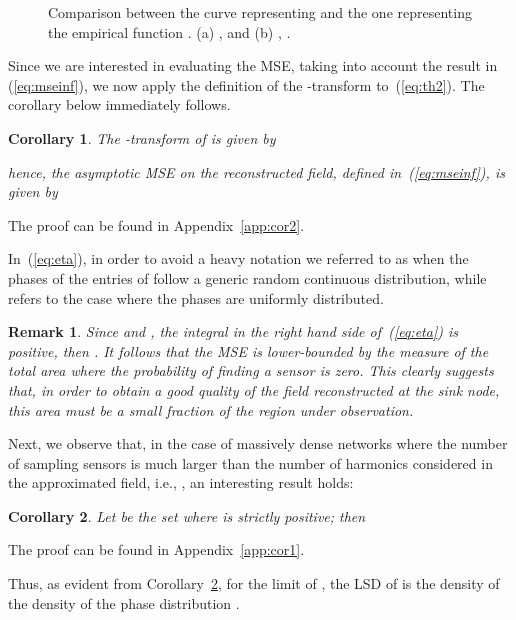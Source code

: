 \documentclass[11pt, draftcls, onecolumn, a4paper]{IEEEtran}
\newtheorem{corollary}{Corollary}[section]
\newtheorem{remark}{Remark}[section]
\begin{document}
\begin{figure}
\centering 
{}
\hspace{0.05\columnwidth}
\caption{Comparison between the curve representing 
 and the one representing
the empirical function .
(a) ,  and (b) , .}
\end{figure}


Since we are  interested in evaluating the MSE, taking into account 
the result in (\ref{eq:mseinf}), we now apply the definition of the 
-transform to~(\ref{eq:th2}).
The corollary below immediately follows.
\begin{corollary}
\label{cor2}
The -transform of  is given by
 
hence, the asymptotic MSE on the reconstructed field, 
defined in~(\ref{eq:mseinf}), is given by 
 
\end{corollary}
\begin{IEEEproof}
The proof can be found in Appendix~\ref{app:cor2}.
\end{IEEEproof}
In~(\ref{eq:eta}), in order to avoid a heavy notation we referred to
 as 
when the phases of the entries of  follow a generic random
continuous distribution, while  refers to
the case where the phases are
uniformly distributed.

\begin{remark}
Since  and , the integral in
the right hand side of~(\ref{eq:eta}) is positive, then
.  It follows that the MSE is
lower-bounded by the measure of the total area where the probability
of finding a sensor is zero. This clearly suggests
that, in order to obtain a
good quality of the field reconstructed at the sink node, 
this area must be a small fraction of the region under observation.
\end{remark}


Next, we observe that, in the case of massively dense networks
where the number of sampling sensors is much larger than the number of
harmonics considered in the approximated field, i.e., ,
an interesting result holds:
\begin{corollary}
\label{cor1}
Let  be the set where  is strictly positive; then

\end{corollary}
\begin{IEEEproof}
The proof can be found in Appendix~\ref{app:cor1}.
\end{IEEEproof}
Thus, as evident from 
Corollary~\ref{cor1}, for the limit of , the LSD of  is the density of the density
of the phase distribution .
\end{document}
